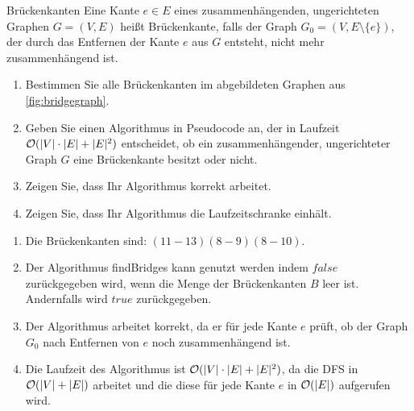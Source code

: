 \documentclass{article}
\begin{document}
\begin{exercise}{Brückenkanten}
  Eine Kante $e \in E$ eines zusammenhängenden, ungerichteten Graphen $G = (V, E)$ heißt Brückenkante, falls der Graph $G_0 = (V, E \setminus \{e\})$, der durch das Entfernen der Kante $e$ aus $G$ entsteht, nicht mehr zusammenhängend ist.
  
  \begin{enumerate}
    \item Bestimmen Sie alle Brückenkanten im abgebildeten Graphen aus \ref{fig:bridgegraph}.
    \item Geben Sie einen Algorithmus in Pseudocode an, der in Laufzeit $\mathcal{O}(|V| \cdot |E| + |E|^2)$ entscheidet, ob ein zusammenhängender, ungerichteter Graph $G$ eine Brückenkante besitzt oder nicht.
    \item Zeigen Sie, dass Ihr Algorithmus korrekt arbeitet.
    \item Zeigen Sie, dass Ihr Algorithmus die Laufzeitschranke einhält.
  \end{enumerate}

  \begin{solution}
    \begin{enumerate}
      \item Die Brückenkanten sind: $(11-13) (8-9) (8-10)$.
      \item Der Algorithmus findBridges kann genutzt werden indem $false$ zurückgegeben wird, wenn die Menge der Brückenkanten $B$ leer ist. Andernfalls wird $true$ zurückgegeben.
      \item Der Algorithmus arbeitet korrekt, da er für jede Kante $e$ prüft, ob der Graph $G_0$ nach Entfernen von $e$ noch zusammenhängend ist.
      \item Die Laufzeit des Algorithmus ist $\mathcal{O}(|V| \cdot |E| + |E|^2)$, da die DFS in $\mathcal{O}(|V| + |E|)$ arbeitet und die diese für jede Kante $e$ in $\mathcal{O}(|E|)$ aufgerufen wird.
    \end{enumerate}
  \end{solution}
\end{exercise}
\end{document}
